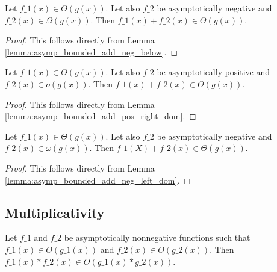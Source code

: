 \begin{lemma}
    \label{lemma:theta_add_neg_Omega}
    \leanok
    Let $f\_1(x) \in \Theta(g(x))$. Let also $f\_2$ be asymptotically negative
    and $f\_2(x) \in \Omega(g(x))$. Then $f\_1(x) + f\_2(x) \in \Theta(g(x))$.
\end{lemma}

\begin{proof}
    \leanok
    This follows directly from Lemma \ref{lemma:asymp_bounded_add_neg_below}.
\end{proof}

\begin{lemma}
    \label{lemma:theta_add_pos_o}
    \leanok
    Let $f\_1(x) \in \Theta(g(x))$. Let also $f\_2$ be asymptotically positive and
    $f\_2(x) \in o(g(x))$. Then $f\_1(x) + f\_2(x) \in \Theta(g(x))$.
\end{lemma}

\begin{proof}
    \leanok
    This follows directly from Lemma \ref{lemma:asymp_bounded_add_pos_right_dom}.
\end{proof}

\begin{theorem}
    \label{thm:theta_add_neg_omega}
    \leanok
    Let $f\_1(x) \in \Theta(g(x))$. Let also $f\_2$ be asymptotically negative and
    $f\_2(x) \in \omega(g(x))$. Then $f\_1(X) + f\_2(x) \in \Theta(g(x))$.
\end{theorem}

\begin{proof}
    \leanok
    This follows directly from Lemma \ref{lemma:asymp_bounded_add_neg_left_dom}.
\end{proof}


\subsection{Multiplicativity}

\begin{lemma}
    \label{lemma:big_o_nonneg_mul}
    \leanok
    Let $f\_1$ and $f\_2$ be asymptotically nonnegative functions such that 
    $f\_1(x) \in O(g\_1(x))$ and $f\_2(x) \in O(g\_2(x))$. Then 
    $f\_1(x) * f\_2(x) \in O(g\_1(x) * g\_2(x))$.
\end{lemma}

